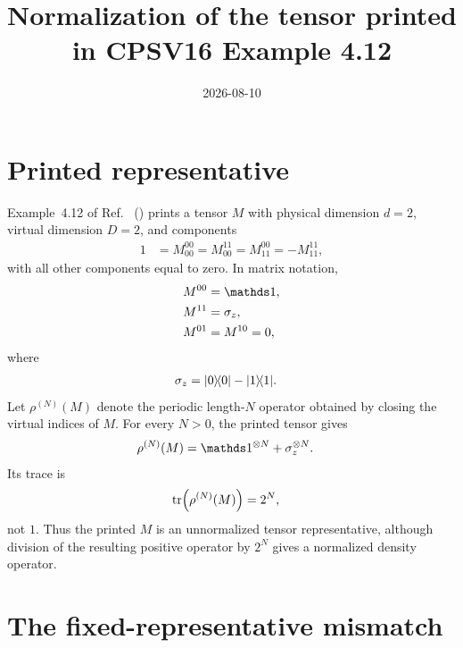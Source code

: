 \documentclass{article}
\title{Normalization of the tensor printed in CPSV16 Example 4.12}
\author{}
\date{2026-08-10}
\begin{document}
\maketitle
{}

\section{Printed representative}

Example~4.12 of Ref.~\cite{Cirac2016MPDO_arXiv}
() prints a tensor $M$
with physical dimension $d=2$, virtual dimension $D=2$, and components
\begin{align}
    1
        &= M_{00}^{00}
         = M_{00}^{11}
         = M_{11}^{00}
         = -M_{11}^{11},
    \label{eq:cpsv412_printed_components}
\end{align}
with all other components equal to zero. In matrix notation,
\begin{align}
    M^{00}
        &= \Id,
    \label{eq:cpsv412_printed_matrix_00}\\
    M^{11}
        &= \sigma_z,
    \label{eq:cpsv412_printed_matrix_11}\\
    M^{01}
        &= M^{10}
         = 0,
    \label{eq:cpsv412_printed_off_diagonal_matrices}
\end{align}
where
\begin{align}
    \sigma_z
        &= |0\rangle\!\langle 0|-|1\rangle\!\langle 1|.
    \label{eq:cpsv412_pauli_z}
\end{align}
Let $\rho^{(N)}(M)$ denote the periodic length-$N$ operator obtained by closing
the virtual indices of $M$. For every $N>0$, the printed tensor gives
\begin{align}
    \rho^{(N)}(M)
        &= \Id^{\otimes N}+\sigma_z^{\otimes N}.
    \label{eq:cpsv412_literal_periodic_family}
\end{align}
Its trace is
\begin{align}
    \operatorname{tr}\!\left(\rho^{(N)}(M)\right)
        &= 2^N,
    \label{eq:cpsv412_literal_trace}
\end{align}
not $1$. Thus the printed $M$ is an unnormalized tensor representative,
although division of the resulting positive operator by $2^N$ gives a
normalized density operator.

\section{The fixed-representative mismatch}
\end{document}
